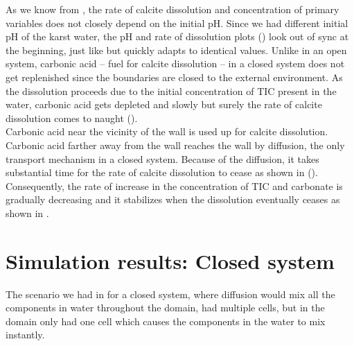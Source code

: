 As we know from , the rate of calcite dissolution and concentration of primary variables 
does not closely depend on the initial pH. Since we had different initial pH of the karst water, the pH and rate of 
dissolution plots () look out of sync at the beginning, just 
like  but quickly adapts to identical values. 
Unlike in an open system, carbonic acid -- fuel for calcite dissolution -- in a closed system does not get replenished since 
the boundaries are closed to the external environment. As the dissolution proceeds due to the initial concentration 
of TIC present in the water, carbonic acid gets depleted and slowly but surely the rate of calcite dissolution comes to naught (). \\

Carbonic acid near the vicinity of the wall is used up for calcite dissolution. Carbonic acid farther away from the wall reaches the wall by 
diffusion, the only transport mechanism in a closed system. Because of the diffusion, it takes substantial time for 
the rate of calcite dissolution to cease as shown in (). Consequently, the rate of increase in the concentration of TIC and carbonate 
is gradually decreasing and it stabilizes when the dissolution eventually ceases as shown in .


\section{\MATLAB Simulation results: Closed system}
The scenario we had in \DuMuX for a closed system, where diffusion would mix all the components in water throughout the domain, 
had multiple cells, but in \MATLAB the domain only had one cell which causes the components in the water to mix instantly. \\

